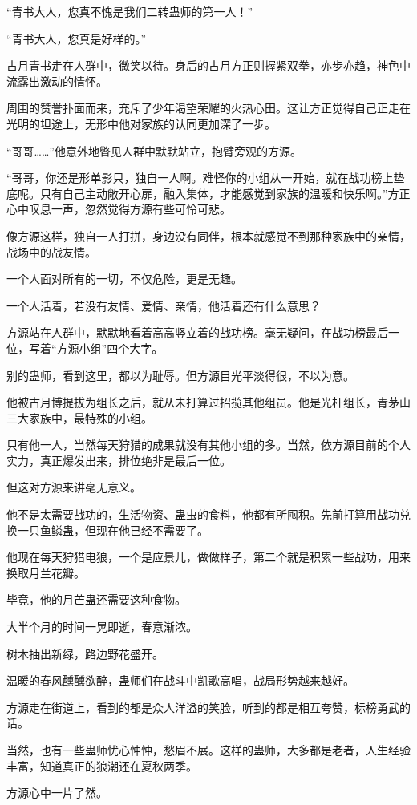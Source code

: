 \begin{this_body}
“青书大人，您真不愧是我们二转蛊师的第一人！”

“青书大人，您真是好样的。”

古月青书走在人群中，微笑以待。身后的古月方正则握紧双拳，亦步亦趋，神色中流露出激动的情怀。

周围的赞誉扑面而来，充斥了少年渴望荣耀的火热心田。这让方正觉得自己正走在光明的坦途上，无形中他对家族的认同更加深了一步。

“哥哥……”他意外地瞥见人群中默默站立，抱臂旁观的方源。

“哥哥，你还是形单影只，独自一人啊。难怪你的小组从一开始，就在战功榜上垫底呢。只有自己主动敞开心扉，融入集体，才能感觉到家族的温暖和快乐啊。”方正心中叹息一声，忽然觉得方源有些可怜可悲。

像方源这样，独自一人打拼，身边没有同伴，根本就感觉不到那种家族中的亲情，战场中的战友情。

一个人面对所有的一切，不仅危险，更是无趣。

一个人活着，若没有友情、爱情、亲情，他活着还有什么意思？

方源站在人群中，默默地看着高高竖立着的战功榜。毫无疑问，在战功榜最后一位，写着“方源小组”四个大字。

别的蛊师，看到这里，都以为耻辱。但方源目光平淡得很，不以为意。

他被古月博提拔为组长之后，就从未打算过招揽其他组员。他是光杆组长，青茅山三大家族中，最特殊的小组。

只有他一人，当然每天狩猎的成果就没有其他小组的多。当然，依方源目前的个人实力，真正爆发出来，排位绝非是最后一位。

但这对方源来讲毫无意义。

他不是太需要战功的，生活物资、蛊虫的食料，他都有所囤积。先前打算用战功兑换一只鱼鳞蛊，但现在他已经不需要了。

他现在每天狩猎电狼，一个是应景儿，做做样子，第二个就是积累一些战功，用来换取月兰花瓣。

毕竟，他的月芒蛊还需要这种食物。

大半个月的时间一晃即逝，春意渐浓。

树木抽出新绿，路边野花盛开。

温暖的春风醺醺欲醉，蛊师们在战斗中凯歌高唱，战局形势越来越好。

方源走在街道上，看到的都是众人洋溢的笑脸，听到的都是相互夸赞，标榜勇武的话。

当然，也有一些蛊师忧心忡忡，愁眉不展。这样的蛊师，大多都是老者，人生经验丰富，知道真正的狼潮还在夏秋两季。

方源心中一片了然。


\end{this_body}
